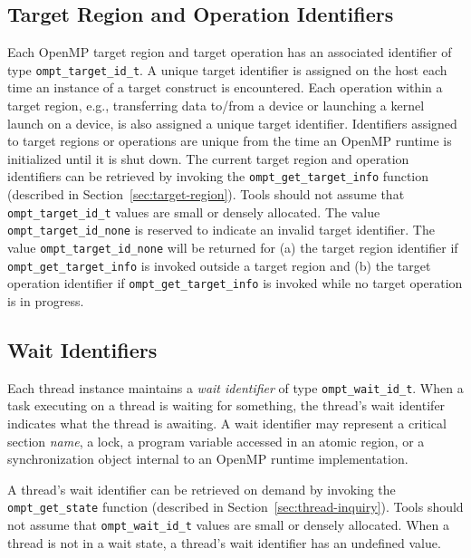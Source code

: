\subsection{Target Region and Operation Identifiers}
Each OpenMP target region and target operation has an associated identifier of type \verb|ompt_target_id_t|. 
A unique target identifier is assigned on the host each time an instance of a target construct is encountered.
Each operation within a target region, e.g., transferring data to/from a device or launching a kernel launch 
on a device, is also assigned a unique target identifier. 
Identifiers assigned to target regions or operations 
are unique from the time an OpenMP runtime is initialized until it is shut down. 
The current target region and operation identifiers can be retrieved by invoking the \verb|ompt_get_target_info| function (described in Section~\ref{sec:target-region}).
Tools should not assume that \verb|ompt_target_id_t| values are small or densely allocated. 
The value \verb|ompt_target_id_none| is reserved to indicate an invalid target identifier. 
The value \verb|ompt_target_id_none| will be returned for (a) the target region identifier if \verb|ompt_get_target_info| is invoked outside a target region and (b) the target operation identifier if \verb|ompt_get_target_info| is invoked while no target operation is in progress.

\subsection{Wait Identifiers}
Each thread instance maintains a {\em wait identifier} of type \verb|ompt_wait_id_t|. 
When a task executing on a thread is waiting for something, the thread's wait identifer indicates what the thread is awaiting. 
A wait identifier may represent a critical section {\em name}, a lock,  a program variable accessed in an atomic region, or a synchronization object internal to an OpenMP runtime implementation. 
\begin{comment}
\begin{quote}
\begin{verbatim}
typedef uint64_t ompt_wait_id_t;
\end{verbatim}
\end{quote}
\end{comment}
A thread's wait identifier can be retrieved on demand by invoking the \verb|ompt_get_state| function (described in Section~\ref{sec:thread-inquiry}).
Tools should not assume that \verb|ompt_wait_id_t| values are small or densely allocated. 
When a thread is not in a wait state, a thread's wait identifier has an undefined value.
 
